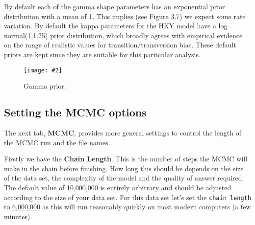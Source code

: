 \documentclass[12pt]{article}
\newcommand{\includeimage}[2][]{%
\texttt{[image: \#2]}
}
\newcommand{\chainLength}{{6,000,000}}
\begin{document}
By default each of the gamma shape parameters has an exponential prior
distribution with a mean of 1. This implies (see Figure 3.7) we expect some
rate variation. By default the kappa parameters for the HKY model have a log
normal(1,1.25) prior distribution, which broadly agrees with empirical evidence
\cite{rosenberg2003patterns} on the range of realistic values for transition/transversion
bias. These default priors are kept since they are suitable for this particular
analysis.

\begin{figure}
\centering
\includeimage[width=\textwidth]{figures/GammaPrior}
\caption{Gamma prior.}
\label{fig:GammaPrior}
\end{figure}



\subsection{Setting the MCMC options}


The next tab, {\bf MCMC}, provides more general
settings to control the length of the MCMC run and the file names. 

Firstly we have the \textbf{Chain Length}. This is the number of
steps the MCMC will make in the chain before finishing. How long this
should be depends on the size of the data set, the complexity of the
model and the quality of answer required. The default value of 10,000,000
is entirely arbitrary and should be adjusted according to the size
of your data set. For this data set let's set the \texttt{chain
length} to \underline{\chainLength{}} as this will run reasonably quickly on most modern
computers (a few minutes).
\end{document}
